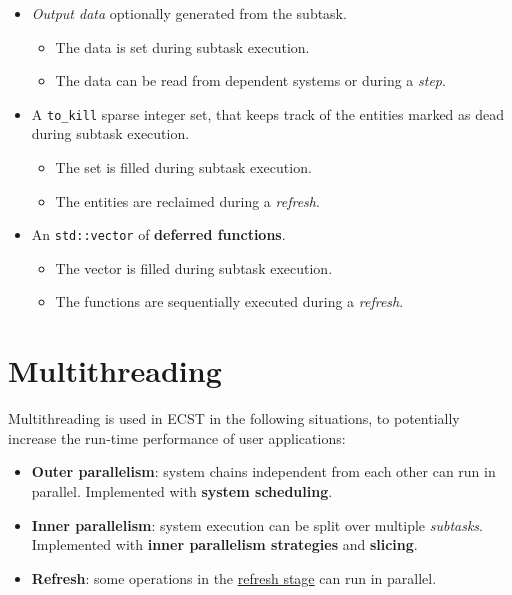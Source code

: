 \documentclass[twoside, 12pt, a4paper, openany]{book}
\begin{document}
\begin{itemize}
\item
  \emph{Output data} optionally generated from the subtask.

  \begin{itemize}
  \item
    The data is set during subtask execution.
  \item
    The data can be read from dependent systems or during a \emph{step}.
  \end{itemize}
\item
  A
  \texttt{to_kill}
  sparse integer set, that keeps track of the entities marked as dead
  during subtask execution.

  \begin{itemize}
  \item
    The set is filled during subtask execution.
  \item
    The entities are reclaimed during a \emph{refresh}.
  \end{itemize}
\item
  An
  \texttt{std::vector}
  of \textbf{deferred functions}.

  \begin{itemize}
  \item
    The vector is filled during subtask execution.
  \item
    The functions are sequentially executed during a \emph{refresh}.
  \end{itemize}
\end{itemize}

\chapter{Multithreading}\label{multithreading}

Multithreading is used in ECST in the following situations, to
potentially increase the run-time performance of user applications:

\begin{itemize}
\item
  \textbf{Outer parallelism}: system chains independent from each other
  can run in parallel. Implemented with \textbf{system scheduling}.
\item
  \textbf{Inner parallelism}: system execution can be split over
  multiple \emph{subtasks}. Implemented with \textbf{inner parallelism
  strategies} and \textbf{slicing}.
\item
  \textbf{Refresh}: some operations in the
  \protect\hyperlink{flow_refresh}{refresh stage} can run in parallel.
\end{itemize}
\end{document}
